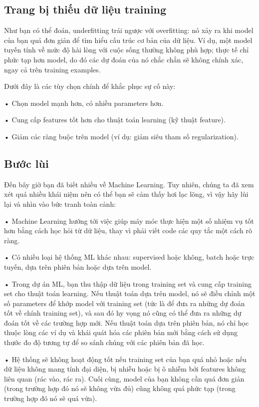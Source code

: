 \subsection{Trang bị thiếu dữ liệu training}

Như bạn có thể đoán, underfitting trái ngược với overfitting: nó xảy ra khi model của bạn quá đơn giản để tìm hiểu cấu trúc cơ bản của dữ liệu. Ví dụ, một model tuyến tính về mức độ hài lòng với cuộc sống thường không phù hợp; thực tế chỉ phức tạp hơn model, do đó các dự đoán của nó chắc chắn sẽ không chính xác, ngay cả trên training examples.

Dưới đây là các tùy chọn chính để khắc phục sự cố này:

• Chọn model mạnh hơn, có nhiều parameters hơn.

• Cung cấp features tốt hơn cho thuật toán learning (kỹ thuật feature).

• Giảm các ràng buộc trên model (ví dụ: giảm siêu tham số regularization).

\subsection{Bước lùi}

Đến bây giờ bạn đã biết nhiều về Machine Learning. Tuy nhiên, chúng ta đã xem xét quá nhiều khái niệm nên có thể bạn sẽ cảm thấy hơi lạc lõng, vì vậy hãy lùi lại và nhìn vào bức tranh toàn cảnh:

• Machine Learning hướng tới việc giúp máy móc thực hiện một số nhiệm vụ tốt hơn bằng cách học hỏi từ dữ liệu, thay vì phải viết code các quy tắc một cách rõ ràng.

• Có nhiều loại hệ thống ML khác nhau: supervised hoặc không, batch hoặc trực tuyến, dựa trên phiên bản hoặc dựa trên model.

• Trong dự án ML, bạn thu thập dữ liệu trong training set và cung cấp training set cho thuật toán learning. Nếu thuật toán dựa trên model, nó sẽ điều chỉnh một số parameters để khớp model với training set (tức là để đưa ra những dự đoán tốt về chính training set), và sau đó hy vọng nó cũng có thể đưa ra những dự đoán tốt về các trường hợp mới. Nếu thuật toán dựa trên phiên bản, nó chỉ học thuộc lòng các ví dụ và khái quát hóa các phiên bản mới bằng cách sử dụng thước đo độ tương tự để so sánh chúng với các phiên bản đã học.

• Hệ thống sẽ không hoạt động tốt nếu training set của bạn quá nhỏ hoặc nếu dữ liệu không mang tính đại diện, bị nhiễu hoặc bị ô nhiễm bởi features không liên quan (rác vào, rác ra). Cuối cùng, model của bạn không cần quá đơn giản (trong trường hợp đó nó sẽ không vừa đủ) cũng không quá phức tạp (trong trường hợp đó nó sẽ quá vừa).

